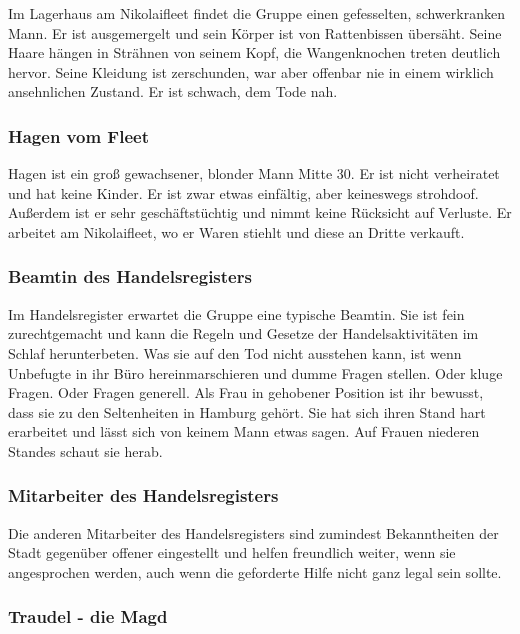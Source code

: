 Im Lagerhaus am Nikolaifleet findet die Gruppe einen gefesselten, schwerkranken Mann. Er ist ausgemergelt und sein Körper ist von Rattenbissen übersäht. Seine Haare hängen in Strähnen von seinem Kopf, die Wangenknochen treten deutlich hervor. Seine Kleidung ist zerschunden, war aber offenbar nie in einem wirklich ansehnlichen Zustand. Er ist schwach, dem Tode nah.

\subsubsection*{Hagen vom Fleet}
\label{Hagen}

Hagen ist ein groß gewachsener, blonder Mann Mitte 30. Er ist nicht verheiratet und hat keine Kinder. Er ist zwar etwas einfältig, aber keineswegs strohdoof. Außerdem ist er sehr geschäftstüchtig und nimmt keine Rücksicht auf Verluste. Er arbeitet am Nikolaifleet, wo er Waren stiehlt und diese an Dritte verkauft.

\subsubsection*{Beamtin des Handelsregisters}
\label{Beamtin}

Im Handelsregister erwartet die Gruppe eine typische Beamtin. Sie ist fein zurechtgemacht und kann die Regeln und Gesetze der Handelsaktivitäten im Schlaf herunterbeten. Was sie auf den Tod nicht ausstehen kann, ist wenn Unbefugte in ihr Büro hereinmarschieren und dumme Fragen stellen. Oder kluge Fragen. Oder Fragen generell. Als Frau in gehobener Position ist ihr bewusst, dass sie zu den Seltenheiten in Hamburg gehört. Sie hat sich ihren Stand hart erarbeitet und lässt sich von keinem Mann etwas sagen. Auf Frauen niederen Standes schaut sie herab.

\subsubsection*{Mitarbeiter des Handelsregisters}
\label{Mitarbeiter}

Die anderen Mitarbeiter des Handelsregisters sind zumindest Bekanntheiten der Stadt gegenüber offener eingestellt und helfen freundlich weiter, wenn sie angesprochen werden, auch wenn die geforderte Hilfe nicht ganz legal sein sollte.

\subsubsection*{Traudel - die Magd}
\label{Traudel}

